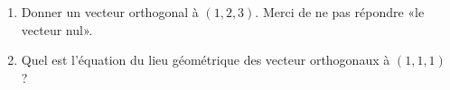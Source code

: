 
\begin{exercice}\label{exoOutilsMath-0016}

	\begin{enumerate}
		\item
			Donner un vecteur orthogonal à $(1,2,3)$. Merci de ne pas répondre «le vecteur nul».
		\item
			Quel est l'équation du lieu géométrique des vecteur orthogonaux à $(1,1,1)$ ?
	\end{enumerate}

\end{exercice}
